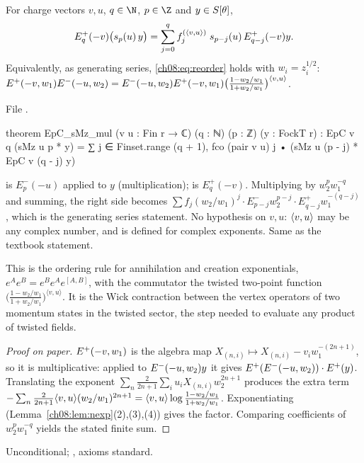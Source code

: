 \begin{theorem}\label{ch08:thm:reorder}
For charge vectors $v,u$, $q\in\N$, $p\in\Z$ and $y\in S[\theta]$,
\begin{equation*}
  E^+_q(-v)\bigl(s_p(u)\,y\bigr)=\sum_{j=0}^{q}f^{(\langle v,u\rangle)}_j\;s_{p-j}(u)\,E^+_{q-j}(-v)y .
\end{equation*}
Equivalently, as generating series, \eqref{ch08:eq:reorder} holds with $w_i=z_i^{1/2}$:
$E^{+}(-v,w_1)E^{-}(-u,w_2)=E^{-}(-u,w_2)E^{+}(-v,w_1)
\bigl(\frac{1-w_2/w_1}{1+w_2/w_1}\bigr)^{\langle v,u\rangle}$.
\end{theorem}
\noindent File .
\begin{leancode}
theorem EpC_sMz_mul (v u : Fin r → ℂ) (q : ℕ) (p : ℤ) (y : FockT r) :
    EpC v q (sMz u p * y) = ∑ j ∈ Finset.range (q + 1),
      fco (pair v u) j • (sMz u (p - j) * EpC v (q - j) y)
\end{leancode}
\begin{dictionary}
 is $E^-_p(-u)$ applied to $y$ (multiplication);  is $E^+_q(-v)$.
Multiplying by $w_2^pw_1^{-q}$ and summing, the right side becomes
$\sum f_j(w_2/w_1)^j\cdot E^-_{p-j}w_2^{p-j}\cdot E^+_{q-j}w_1^{-(q-j)}$, which is the generating
series statement.  No hypothesis on $v,u$: $\langle v,u\rangle$ may be any complex number, and
 is defined for complex exponents.  Same as the textbook statement.
\end{dictionary}

\begin{physics}
This is the ordering rule for annihilation and creation exponentials, $e^{A}e^{B}=e^Be^Ae^{[A,B]}$, with the commutator the twisted two-point function $\bigl(\frac{1-w_2/w_1}{1+w_2/w_1}\bigr)^{\langle v,u\rangle}$. It is the Wick contraction between the vertex operators of two momentum states in the twisted sector, the step needed to evaluate any product of twisted fields.
\end{physics}
\begin{proof}[Proof on paper]
$E^{+}(-v,w_1)$ is the algebra map $X_{(n,i)}\mapsto X_{(n,i)}-v_iw_1^{-(2n+1)}$, so it is
multiplicative: applied to $E^{-}(-u,w_2)y$ it gives
$E^{+}(E^{-}(-u,w_2))\cdot E^{+}(y)$.  Translating the exponent
$\sum_{n}\frac{2}{2n+1}\sum_iu_iX_{(n,i)}w_2^{2n+1}$ produces the extra term
$-\sum_n\frac2{2n+1}\langle v,u\rangle(w_2/w_1)^{2n+1}=\langle v,u\rangle\log\frac{1-w_2/w_1}{1+w_2/w_1}$.
Exponentiating (Lemma~\ref{ch08:lem:nexp}(2),(3),(4)) gives the factor.  Comparing coefficients of
$w_2^pw_1^{-q}$ yields the stated finite sum.
\end{proof}
\begin{status}
Unconditional; , axioms standard.
\end{status}

